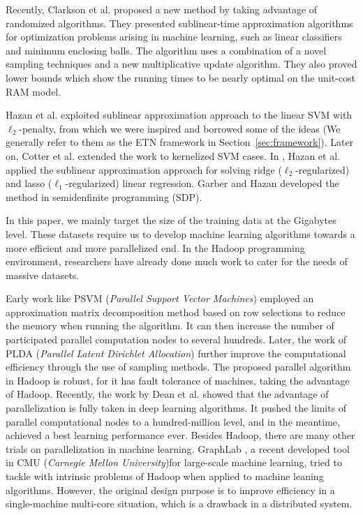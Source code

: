 \documentclass{llncs}
\begin{document}
Recently, Clarkson et al. \cite{clarkson2010sublinear} proposed a new method by taking advantage of randomized algorithms.
They presented sublinear-time approximation algorithms for optimization problems arising in machine learning, such as linear classifiers and minimum enclosing balls.
The algorithm uses a combination of a novel sampling techniques and a new multiplicative update algorithm. They also proved lower bounds which show the running times to be nearly optimal on the unit-cost RAM model.

Hazan et al. \cite{hazanbeating} exploited sublinear approximation approach to the linear SVM with $\ell_2$-penalty, from which we were inspired and borrowed some of the ideas (We generally refer to them as the ETN framework in Section~\ref{sec:framework}).
Later on, Cotter et al. \cite{cotter2012kernelized} extended the work to kernelized SVM cases.
In \cite{hazan2011optimal}, Hazan et al. applied the sublinear approximation approach for solving ridge ($\ell_2$-regularized) and lasso ($\ell_1$-regularized) linear regression.
Garber and Hazan \cite{garberapproximating} developed the method in semidenfinite programming (SDP).

In this paper, we mainly target the size of the training data at the Gigabytes level. These datasets require us to develop machine learning algorithms towards a more efficient and more parallelized end. In the Hadoop programming environment, researchers have already done much work to cater for the needs of massive datasets.

Early work like PSVM (\textit{Parallel Support Vector Machines}) \cite{chang2007psvm} employed an approximation matrix decomposition method based on row selections to reduce the memory when running the algorithm. It can then increase the number of participated parallel computation nodes to several hundreds. Later, the work of PLDA (\textit{Parallel Latent Dirichlet Allocation}) \cite{wang2009plda} further improve the computational efficiency through the use of sampling methods. The proposed parallel algorithm in Hadoop is robust, for it has fault tolerance of machines, taking the advantage of Hadoop. Recently, the work by Dean et al. \cite{dean2007largescale} showed that the advantage of parallelization is fully taken in deep learning algorithms. It pushed the limits of parallel computational nodes to a hundred-million level, and in the meantime, achieved a best learning performance ever. Besides Hadoop, there are many other trials on parallelization in machine learning. GraphLab \cite{kyrola2012graphchi}, a recent developed tool in CMU (\textit{Carnegie Mellon University})for large-scale machine learning, tried to tackle with intrinsic problems of Hadoop when applied to machine leaning algorithms. However, the original design purpose is to improve efficiency in a single-machine multi-core situation, which is a drawback in a distributed system.
\end{document}
